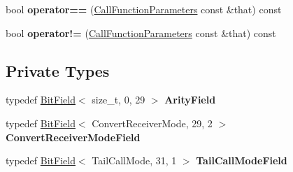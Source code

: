 \begin{DoxyCompactItemize}
\item 
bool {\bfseries operator==} (\hyperlink{classv8_1_1internal_1_1compiler_1_1_call_function_parameters}{Call\+Function\+Parameters} const \&that) const \hypertarget{classv8_1_1internal_1_1compiler_1_1_call_function_parameters_abfff8999f5d6ef74f3169b673d97fc50}{}\label{classv8_1_1internal_1_1compiler_1_1_call_function_parameters_abfff8999f5d6ef74f3169b673d97fc50}

\item 
bool {\bfseries operator!=} (\hyperlink{classv8_1_1internal_1_1compiler_1_1_call_function_parameters}{Call\+Function\+Parameters} const \&that) const \hypertarget{classv8_1_1internal_1_1compiler_1_1_call_function_parameters_a755a5d4ed4cdee7bf2db040e59dc3b47}{}\label{classv8_1_1internal_1_1compiler_1_1_call_function_parameters_a755a5d4ed4cdee7bf2db040e59dc3b47}

\end{DoxyCompactItemize}
\subsection*{Private Types}
\begin{DoxyCompactItemize}
\item 
typedef \hyperlink{classv8_1_1internal_1_1_bit_field}{Bit\+Field}$<$ size\+\_\+t, 0, 29 $>$ {\bfseries Arity\+Field}\hypertarget{classv8_1_1internal_1_1compiler_1_1_call_function_parameters_a89cb620ab1afb3e0b3522ba0c904aaf3}{}\label{classv8_1_1internal_1_1compiler_1_1_call_function_parameters_a89cb620ab1afb3e0b3522ba0c904aaf3}

\item 
typedef \hyperlink{classv8_1_1internal_1_1_bit_field}{Bit\+Field}$<$ Convert\+Receiver\+Mode, 29, 2 $>$ {\bfseries Convert\+Receiver\+Mode\+Field}\hypertarget{classv8_1_1internal_1_1compiler_1_1_call_function_parameters_a8e1ccfc7a7a37f9395023116c4167df7}{}\label{classv8_1_1internal_1_1compiler_1_1_call_function_parameters_a8e1ccfc7a7a37f9395023116c4167df7}

\item 
typedef \hyperlink{classv8_1_1internal_1_1_bit_field}{Bit\+Field}$<$ Tail\+Call\+Mode, 31, 1 $>$ {\bfseries Tail\+Call\+Mode\+Field}\hypertarget{classv8_1_1internal_1_1compiler_1_1_call_function_parameters_af4ad5f63e743ad4bb0fe2b78cab1f14c}{}\label{classv8_1_1internal_1_1compiler_1_1_call_function_parameters_af4ad5f63e743ad4bb0fe2b78cab1f14c}

\end{DoxyCompactItemize}
